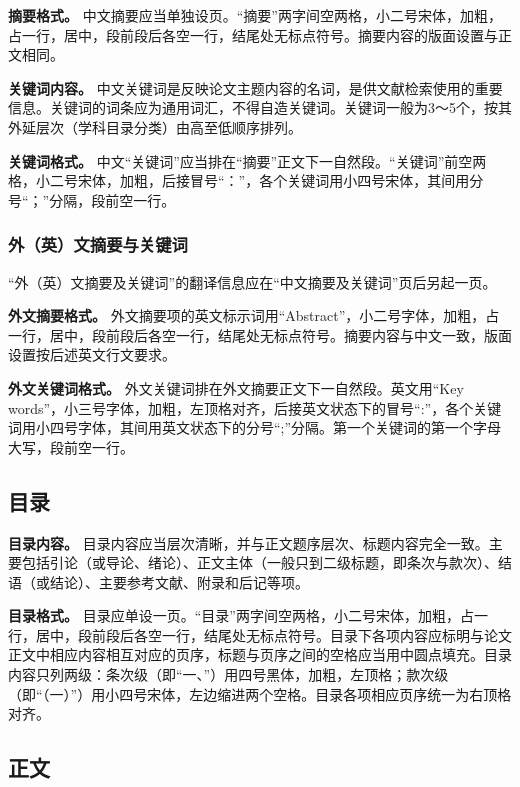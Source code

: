\documentclass[doublesided]{Style/ucasthesis}%
\begin{document}
\textbf{摘要格式。} 中文摘要应当单独设页。``摘要''两字间空两格，小二号宋体，加粗，占一行，居中，段前段后各空一行，结尾处无标点符号。摘要内容的版面设置与正文相同。

\textbf{关键词内容。} 中文关键词是反映论文主题内容的名词，是供文献检索使用的重要信息。关键词的词条应为通用词汇，不得自造关键词。关键词一般为3～5个，按其外延层次（学科目录分类）由高至低顺序排列。

\textbf{关键词格式。} 中文``关键词''应当排在``摘要''正文下一自然段。``关键词''前空两格，小二号宋体，加粗，后接冒号``：''，各个关键词用小四号宋体，其间用分号``；''分隔，段前空一行。

\hypertarget{section-16}{%
\subsubsection{外（英）文摘要与关键词}\label{section-16}}

``外（英）文摘要及关键词''的翻译信息应在``中文摘要及关键词''页后另起一页。

\textbf{外文摘要格式。} 外文摘要项的英文标示词用``Abstract''，小二号字体，加粗，占一行，居中，段前段后各空一行，结尾处无标点符号。摘要内容与中文一致，版面设置按后述英文行文要求。

\textbf{外文关键词格式。} 外文关键词排在外文摘要正文下一自然段。英文用``Key words''，小三号字体，加粗，左顶格对齐，后接英文状态下的冒号``:''，各个关键词用小四号字体，其间用英文状态下的分号``;''分隔。第一个关键词的第一个字母大写，段前空一行。

\hypertarget{section-17}{%
\subsection{目录}\label{section-17}}

\textbf{目录内容。} 目录内容应当层次清晰，并与正文题序层次、标题内容完全一致。主要包括引论（或导论、绪论）、正文主体（一般只到二级标题，即条次与款次）、结语（或结论）、主要参考文献、附录和后记等项。

\textbf{目录格式。} 目录应单设一页。``目录''两字间空两格，小二号宋体，加粗，占一行，居中，段前段后各空一行，结尾处无标点符号。目录下各项内容应标明与论文正文中相应内容相互对应的页序，标题与页序之间的空格应当用中圆点填充。目录内容只列两级：条次级（即``一、''）用四号黑体，加粗，左顶格；款次级（即``（一）''）用小四号宋体，左边缩进两个空格。目录各项相应页序统一为右顶格对齐。

\hypertarget{section-18}{%
\subsection{正文}\label{section-18}}
\end{document}
